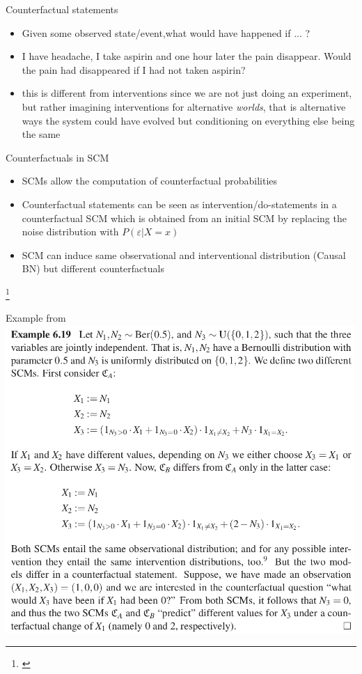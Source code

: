 \documentclass{beamer}
\newcommand\blfootnote[1]{%
  \begingroup
  \renewcommand\thefootnote{}\footnote{#1}%
  \addtocounter{footnote}{-1}%
  \endgroup
}
\begin{document}
\begin{frame}{Counterfactual statements}
	\begin{itemize}
		\item<1-> Given some observed state/event,what would have happened if ... ? 
		\item<2-> I have headache, I take aspirin and one hour later the pain disappear. 
		      Would the pain had disappeared if I had not taken aspirin? 
	      \item<3-> this is different from interventions since we are not just doing an experiment, 
		      but rather imagining interventions for alternative \emph{worlds}, that is 
			alternative ways the system could have evolved but conditioning on everything 
			else being the same 
	\end{itemize}
\end{frame}

\begin{frame}{Counterfactuals in SCM}
	\begin{itemize}
		\item SCMs allow the computation of counterfactual probabilities 
		\item Counterfactual statements can be seen as intervention/do-statements in 
			a counterfactual SCM which is obtained from an initial SCM by replacing the 
			noise distribution with $P(\varepsilon | X = x)$
		\item<2-> SCM can induce same observational and interventional distribution (Causal BN) 
			but different counterfactuals
	\end{itemize}
	\blfootnote{\citet{peters2017elements, bareinboim2022pearl}}

\end{frame}

\begin{frame}{Example from \citet{peters2017elements}}
	\includegraphics[scale=0.25]{images/counter_example}
\end{frame}
\end{document}
